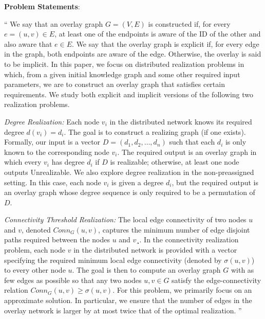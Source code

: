 \documentclass[11pt,a4paper]{article}
\theoremstyle{definition}
\begin{document}
\begin{enumerate}
\textbf{Problem Statements}:

``
We say that an overlay graph $G = (V, E)$ is constructed if, for every $e = (u, v) \in E$, at
least one of the endpoints is aware of the ID of the other and also aware that $e \in E$. We say that the overlay graph
is explicit if, for every edge in the graph, both endpoints are aware of the edge. Otherwise, the overlay is said to be
implicit. In this paper, we focus on distributed realization problems in which, from a given initial knowledge graph
and some other required input parameters, we are to construct an overlay graph that satisfies certain requirements. We
study both explicit and implicit versions of the following two realization problems.

\emph{Degree Realization:} Each node $v_i$ in the distributed network knows its required degree $d(v_i) = d_i$. The goal is to
construct a realizing graph (if one exists). Formally, our input is a vector $D = (d_1, d_2, \dots, d_n)$ such that each $d_i$
is only known to the corresponding node $v_i$. The required output is an overlay graph in which every $v_i$ has degree
$d_i$ if $D$ is realizable; otherwise, at least one node outputs Unrealizable. We also explore degree realization in the
non-preassigned setting. In this case, each node $v_i$ is given a degree $d_i$, but the required output is an overlay graph
whose degree sequence is only required to be a permutation of $D$.

\emph{Connectivity Threshold Realization:} The local edge connectivity of two nodes $u$ and $v$, denoted $Conn_G(u, v)$, captures the minimum number of edge disjoint paths required between the nodes $u$ and $v$¸. In the connectivity realization
problem, each node $v$ in the distributed network is provided with a vector specifying the required minimum local edge
connectivity (denoted by $\sigma (u, v)$) to every other node $u$. The goal is then to compute an overlay graph $G$ with as few
edges as possible so that any two nodes $u, v \in G$ satisfy the edge-connectivity relation $Conn_G(u, v) \geq \sigma (u, v)$.
For this problem, we primarily focus on an approximate solution. In particular, we ensure that the number of edges in
the overlay network is larger by at most twice that of the optimal realization.
''
\end{enumerate}
\end{document}
